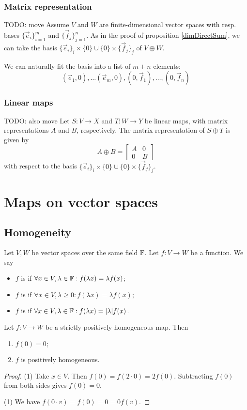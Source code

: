 \subsubsection{Matrix representation}
TODO: move
Assume $V$ and $W$ are finite-dimensional vector spaces with resp. bases $\{\vec{e}_i\}_{i=1}^m$ and $\{\vec{f}_j\}_{j=1}^n$.
As in the proof of proposition \ref{dimDirectSum}, we can take the basis $\{\vec{e}_i\}_i\times\{0\} \cup \{0\}\times\{\vec{f}_j\}_j$ of $V\oplus W$.

We can naturally fit the basis into a list of $m+n$ elements:
\[ (\vec{e}_1,0),\ldots (\vec{e}_m, 0), (0, \vec{f}_1), \ldots, (0,\vec{f}_n)  \]
\subsubsection{Linear maps}
TODO: also move
Let $S: V\to X$ and $T:W\to Y$ be linear maps, with matrix representations $A$ and $B$, respectively. The matrix representation of $S\oplus T$ is given by
\[ A\oplus B = \begin{bmatrix}
A & 0 \\
0 & B
\end{bmatrix} \]
with respect to the basis $\{\vec{e}_i\}_i\times\{0\} \cup \{0\}\times\{\vec{f}_j\}_j$.

\section{Maps on vector spaces}
\subsection{Homogeneity}
\begin{definition}
Let $V, W$ be vector spaces over the same field $\mathbb{F}$. Let $f: V\to W$ be a function. We say
\begin{itemize}
\item $f$ is  if $\forall x\in V,\lambda\in \mathbb{F}: f(\lambda x) = \lambda f(x)$;
\item $f$ is  if $\forall x\in V,\lambda\geq 0: f(\lambda x) = \lambda f(x)$;
\item $f$ is  if $\forall x\in V,\lambda\in\mathbb{F}: f(\lambda x) = |\lambda| f(x)$.
\end{itemize}
\end{definition}

\begin{lemma} \label{homogeneousFunctionLemma}
Let $f: V\to W$ be a strictly positively homogeneous map. Then
\begin{enumerate}
\item $f(0) = 0$;
\item $f$ is positively homogeneous.
\end{enumerate}
\end{lemma}
\begin{proof}
(1) Take $x\in V$. Then $f(0) = f(2\cdot 0) = 2f(0)$. Subtracting $f(0)$ from both sides gives $f(0) = 0$.

(1) We have $f(0\cdot v) = f(0) = 0 = 0f(v)$.
\end{proof}

